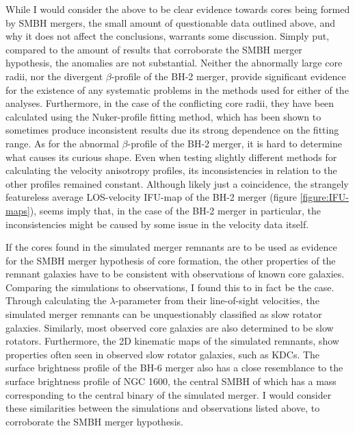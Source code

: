 \documentclass[english, twoside]{HYgradu}
\begin{document}
While I would consider the above to be clear evidence towards cores being formed by SMBH mergers, the small amount of questionable data outlined above, and why it does not affect the conclusions, warrants some discussion. Simply put, compared to the amount of results that corroborate the SMBH merger hypothesis, the anomalies are not substantial. Neither the abnormally large core radii, nor the divergent $\beta$-profile of the BH-2 merger, provide significant evidence for the existence of any systematic problems in the methods used for either of the analyses. Furthermore, in the case of the conflicting core radii, they have been calculated using the Nuker-profile fitting method, which has been shown to sometimes produce inconsistent results due its strong dependence on the fitting range. As for the abnormal $\beta$-profile of the BH-2 merger, it is hard to determine what causes its curious shape. Even when testing slightly different methods for calculating the velocity anisotropy profiles, its inconsistencies in relation to the other profiles remained constant. Although likely just a coincidence, the strangely featureless average LOS-velocity IFU-map of the BH-2 merger (figure \ref{figure:IFU-maps}), seems imply that, in the case of the BH-2 merger in particular, the inconsistencies might be caused by some issue in the velocity data itself.  

If the cores found in the simulated merger remnants are to be used as evidence for the SMBH merger hypothesis of core formation, the other properties of the remnant galaxies have to be consistent with observations of known core galaxies. Comparing the simulations to observations, I found this to in fact be the case. Through calculating the $\lambda$-parameter from their line-of-sight velocities, the simulated merger remnants can be unquestionably classified as slow rotator galaxies. Similarly, most observed core galaxies are also determined to be slow rotators. Furthermore, the 2D kinematic maps of the simulated remnants, show properties often seen in observed slow rotator galaxies, such as KDCs. The surface brightness profile of the BH-6 merger also has a close resemblance to the surface brightness profile of NGC 1600, the central SMBH of which has a mass corresponding to the central binary of the simulated merger. I would consider these similarities between the simulations and observations listed above, to corroborate the SMBH merger hypothesis.
\end{document}
